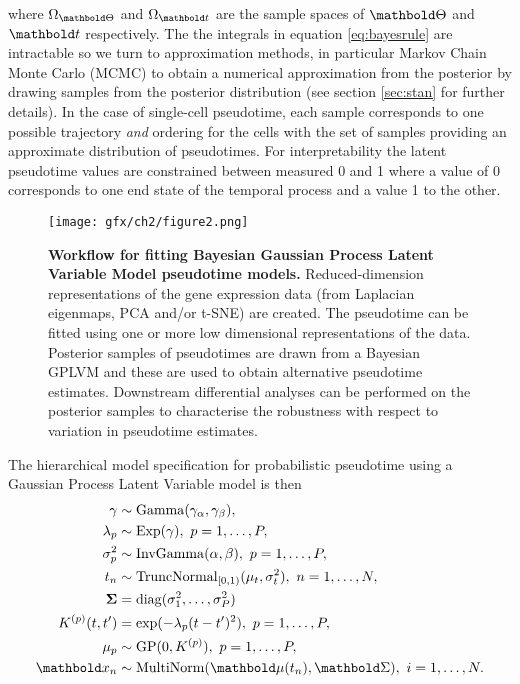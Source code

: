 where $\Omega_{\mbTheta}$ and $\Omega_{\mbt}$ are the sample spaces of $\mbTheta$ and $\mbt$ respectively. The the integrals in equation \ref{eq:bayesrule} are intractable so we turn to approximation methods, in particular Markov Chain Monte Carlo (MCMC) to obtain a numerical approximation from the posterior by drawing samples from the posterior distribution (see section \ref{sec:stan} for further details). In the case of single-cell pseudotime, each sample corresponds to one possible trajectory \emph{and} ordering for the cells with the set of samples providing an approximate distribution of pseudotimes. For interpretability the latent pseudotime values are constrained between measured 0 and 1 where a value of 0 corresponds to one end state of the temporal process and a value 1 to the other.

\begin{figure}
\centering
  \texttt{[image: gfx/ch2/figure2.png]}
  \caption{{\bf Workflow for fitting Bayesian Gaussian Process Latent Variable Model pseudotime models.} Reduced-dimension representations of the gene expression data (from Laplacian eigenmaps, PCA and/or t-SNE) are created. The pseudotime can be fitted using one or more low dimensional representations of the data. Posterior samples of pseudotimes are drawn from a Bayesian GPLVM and these are used to obtain alternative pseudotime estimates. Downstream differential analyses can be performed on the posterior samples to characterise the robustness with respect to variation in pseudotime estimates.} \label{fig:workflow}
\end{figure}

The hierarchical model specification for probabilistic pseudotime using a Gaussian Process Latent Variable model is then
\begin{equation} \label{eq:model}
\begin{aligned}
	\gamma & \sim \mathrm{Gamma}(\gamma_\alpha, \gamma_\beta), \\
	\lambda_p & \sim  \mathrm{Exp(\gamma)}, ~p=1,\dots, P, \\
	 \sigma_p^2 & \sim   \mathrm{InvGamma}(\alpha, \beta), ~p=1,\dots, P, \\
	t_n & \sim
			\mathrm{TruncNormal}_{[0, 1)}(\mu_t, \sigma_t^2), ~n=1,\dots,N,\\
	\bSigma & =  \mathrm{diag}(\sigma_1^2, \dots, \sigma_P^2) \\
	K^{(p)}(t, t') & = \exp( -\lambda_p (t-t')^2 ), ~p=1,\dots, P, \\
	\mu_p &\sim  \mathrm{GP}(0, K^{(p)}), ~ p=1,\dots,P,  \\
	\mbx_{n} & \sim  \mathrm{MultiNorm}( \mbmu(t_n), \mbSigma ), ~i=1,\dots,N.
\end{aligned}
\end{equation}\label{eq:pseudogp_model}


